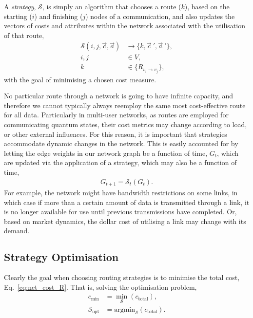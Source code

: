 \documentclass[aps,rmp,twocolumn,amsmath,amssymb,nofootinbib,superscriptaddress]{revtex4}
\begin{document}
A \emph{strategy}, $\mathcal{S}$, is simply an algorithm that chooses a route ($k$), based on the starting ($i$) and finishing ($j$) nodes of a communication, and also updates the vectors of costs and attributes within the network associated with the utilisation of that route,
\begin{align}
\mathcal{S}(i,j,\vec{c},\vec{a}) &\to \{k,{\vec{c}}~',{\vec{a}}~'\}, \nonumber \\
i,j &\in V, \nonumber\\
k &\in \{R_{v_i\to v_j}\},
\end{align}
with the goal of minimising a chosen cost measure.

No particular route through a network is going to have infinite capacity, and therefore we cannot typically always reemploy the same most cost-effective route for all data. Particularly in multi-user networks, as routes are employed for communicating quantum states, their cost metrics may change according to load, or other external influences. For this reason, it is important that strategies accommodate dynamic changes in the network. This is easily accounted for by letting the edge weights in our network graph be a function of time, $G_t$, which are updated via the application of a strategy, which may also be a function of time,
\begin{align} \label{eq:S_G}
G_{t+1} = \mathcal{S}_t(G_t).
\end{align}
For example, the network might have bandwidth restrictions on some links, in which case if more than a certain amount of data is transmitted through a link, it is no longer available for use until previous transmissions have completed. Or, based on market dynamics, the dollar cost of utilising a link may change with its demand.

%
%

\subsection{Strategy Optimisation} \label{sec:strat_opt}

Clearly the goal when choosing routing strategies is to minimise the total cost, Eq.~\ref{eq:net_cost_R}. That is, solving the optimisation problem,
\begin{align}
c_\mathrm{min} &= \min_\mathcal{S} (c_\mathrm{total}), \nonumber \\
\mathcal{S}_\mathrm{opt} &= \mathrm{argmin}_\mathcal{S} (c_\mathrm{total}).
\end{align}
\end{document}

